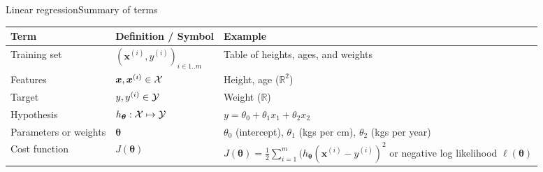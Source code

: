 \documentclass{beamer}
\renewcommand{\vec}[1]{\boldsymbol{#1}}
\def\Rset{\mathbb{R}}
\begin{document}
\begin{frame}{Linear regression}{Summary of terms}

  
  \begin{tabular}{>{\raggedright}p{}>{\raggedright}p{}>{\raggedright\arraybackslash}p{}}
    \hline
    \textbf{Term} & \textbf{Definition / Symbol} & \textbf{Example} \\
    \hline
    Training set & $(\vec{x}^{(i)},y^{(i)})_{i \in 1..m}$ & Table of heights, ages, and weights \\
    \hline
    Features & $\vec{x}, \vec{x}^{(i)} \in {\cal X}$ & Height, age ($\Rset^2$) \\
    \hline
    Target & $y, y^{(i)} \in {\cal Y}$ & Weight ($\Rset$) \\
    \hline
    Hypothesis & $h_{\vec{\theta}} : {\cal X} \mapsto {\cal Y}$ & $y = \theta_0 + \theta_1 x_1 + \theta_2 x_2$ \\
    \hline
    Parameters or weights & $\vec{\theta}$ & $\theta_0$ (intercept), $\theta_1$ (kgs per cm), $\theta_2$ (kgs per year) \\
    \hline
    Cost function & $J(\vec{\theta})$ & $J(\vec{\theta}) = \frac{1}{2}\sum_{i=1}^m(h_{\vec{\theta}}(\vec{x}^{(i)} - y^{(i)})^2$ or negative log likelihood $\ell(\vec{\theta})$ \\
    \hline
  \end{tabular}

\end{frame}
\end{document}
